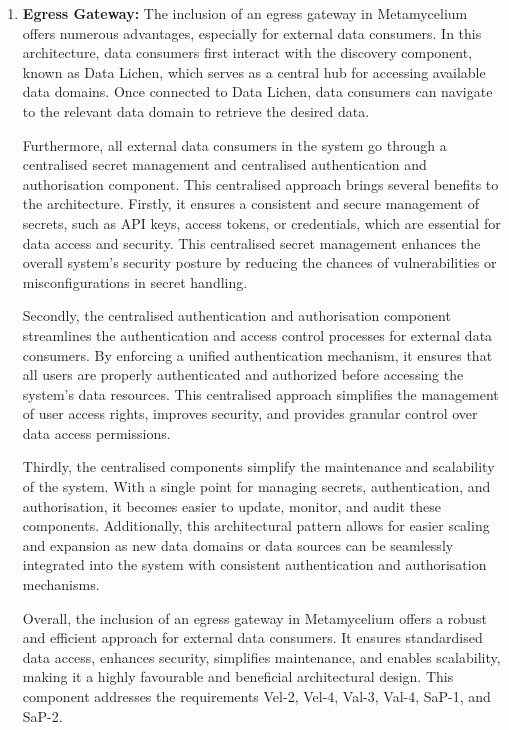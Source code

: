 \documentclass[preprint,12pt]{elsarticle}
\begin{document}
\begin{enumerate}
    \item \textbf{Egress Gateway:} The inclusion of an egress gateway in Metamycelium offers numerous advantages, especially for external data consumers. In this architecture, data consumers first interact with the discovery component, known as Data Lichen, which serves as a central hub for accessing available data domains. Once connected to Data Lichen, data consumers can navigate to the relevant data domain to retrieve the desired data.

    Furthermore, all external data consumers in the system go through a centralised secret management and centralised authentication and authorisation component. This centralised approach brings several benefits to the architecture. Firstly, it ensures a consistent and secure management of secrets, such as API keys, access tokens, or credentials, which are essential for data access and security. This centralised secret management enhances the overall system's security posture by reducing the chances of vulnerabilities or misconfigurations in secret handling.

    Secondly, the centralised authentication and authorisation component streamlines the authentication and access control processes for external data consumers. By enforcing a unified authentication mechanism, it ensures that all users are properly authenticated and authorized before accessing the system's data resources. This centralised approach simplifies the management of user access rights, improves security, and provides granular control over data access permissions.

    Thirdly, the centralised components simplify the maintenance and scalability of the system. With a single point for managing secrets, authentication, and authorisation, it becomes easier to update, monitor, and audit these components. Additionally, this architectural pattern allows for easier scaling and expansion as new data domains or data sources can be seamlessly integrated into the system with consistent authentication and authorisation mechanisms.

    Overall, the inclusion of an egress gateway in Metamycelium offers a robust and efficient approach for external data consumers. It ensures standardised data access, enhances security, simplifies maintenance, and enables scalability, making it a highly favourable and beneficial architectural design. This component addresses the requirements Vel-2, Vel-4, Val-3, Val-4, SaP-1, and SaP-2.
    

\end{enumerate}
\end{document}
